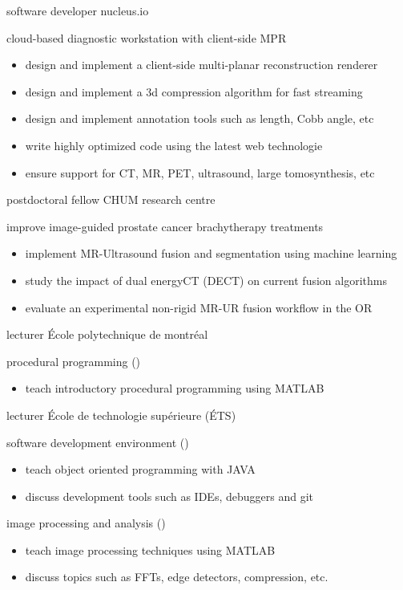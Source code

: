 \documentclass[print]{friggeri-cv}
\begin{document}
\begin{entrylist}
  {software developer} {nucleus.io}
  {cloud-based diagnostic workstation with client-side {\small MPR}
  \begin{itemize}
    \item design and implement a client-side multi-planar reconstruction renderer
    \item design and implement a 3d compression algorithm for fast streaming
    \item design and implement annotation tools such as length, Cobb angle, etc 
    \item write highly optimized code using the latest web technologie
    \item ensure support for {\small CT}, {\small MR}, {\small PET}, ultrasound, large tomosynthesis, etc 
  \end{itemize}}

  {postdoctoral fellow}
  {CHUM research centre}
  {improve image-guided prostate cancer brachytherapy treatments
  \begin{itemize}
    \item implement MR-Ultrasound fusion and segmentation using machine learning
    \item study the impact of dual energy{\small  CT} ({\small DECT}) on current fusion algorithms
    \item evaluate an experimental non-rigid {\small MR-UR} fusion workflow in the {\small OR}
  \end{itemize}}


  {lecturer}
  {École polytechnique de montréal} 
  {procedural programming (\infmat)
  \begin{itemize}
    \item teach introductory procedural programming using {\small MATLAB}
  \end{itemize}}

  {lecturer}
  {École de technologie supérieure {\scriptsize (ÉTS)}}
  {software development environment (\eleenv)
  \begin{itemize}
    \item teach object oriented programming with {\small JAVA}
    \item discuss development tools such as {\small IDE}s, debuggers and git 
  \end{itemize}
  image processing and analysis (\eletr)
    \begin{itemize}
    \item teach image processing techniques using {\small MATLAB}
    \item discuss topics such as {\small FFT}s, edge detectors, compression, etc.  
  \end{itemize}
  }
\end{entrylist}
\end{document}
